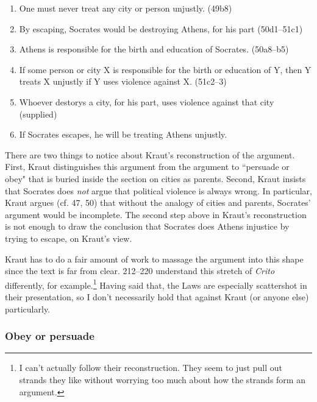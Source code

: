 \documentclass[12pt,letterpaper]{article}
\begin{document}
\begin{enumerate}

    \item One must never treat any city or person unjustly. (49b8)

    \item By escaping, Socrates would be destroying Athens, for his part (50d1--51c1)

    \item Athens is responsible for the birth and education of Socrates. (50a8--b5)

    \item If some person or city X is responsible for the birth or education of Y, then Y treats X unjustly if Y uses violence against X. (51c2--3)

    \item Whoever destorys a city, for his part, uses violence against that city (supplied)

    \item If Socrates escapes, he will be treating Athens unjustly.

\end{enumerate}

There are two things to notice about Kraut's reconstruction of the argument. First, Kraut distinguishes this argument from the argument to ``persuade or obey" that is buried inside the section on cities as parents. Second, Kraut insists that Socrates does \emph{not} argue that political violence is always wrong. In particular, Kraut argues (cf. 47, 50) that without the analogy of cities and parents, Socrates' argument would be incomplete. The second step above in Kraut's reconstruction is not enough to draw the conclusion that Socrates does Athens injustice by trying to escape, on Kraut's view.

Kraut has to do a fair amount of work to massage the argument into this shape since the text is far from clear. \cite{brickhouse-smith2004-plato-trial-of-socrates} 212--220 understand this stretch of \textit{Crito} differently, for example.\footnote{I can't actually follow their reconstruction. They seem to just pull out strands they like without worrying too much about how the strands form an argument.}  Having said that, the Laws are especially scattershot in their presentation, so I don't necessarily hold that against Kraut (or anyone else) particularly.


\subsubsection*{Obey or persuade}
\end{document}
